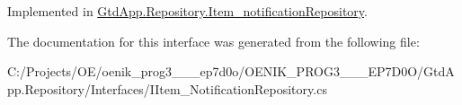 Implemented in \mbox{\hyperlink{class_gtd_app_1_1_repository_1_1_item__notification_repository_ac26afe22f48577db6c569410a33a8204}{Gtd\+App.\+Repository.\+Item\+\_\+notification\+Repository}}.



The documentation for this interface was generated from the following file\+:\begin{DoxyCompactItemize}
\item 
C\+:/\+Projects/\+O\+E/oenik\+\_\+prog3\+\_\+\_\+\_\+ep7d0o/\+O\+E\+N\+I\+K\+\_\+\+P\+R\+O\+G3\+\_\+\_\+\_\+\+E\+P7\+D0\+O/\+Gtd\+App.\+Repository/\+Interfaces/I\+Item\+\_\+\+Notification\+Repository.\+cs\end{DoxyCompactItemize}
